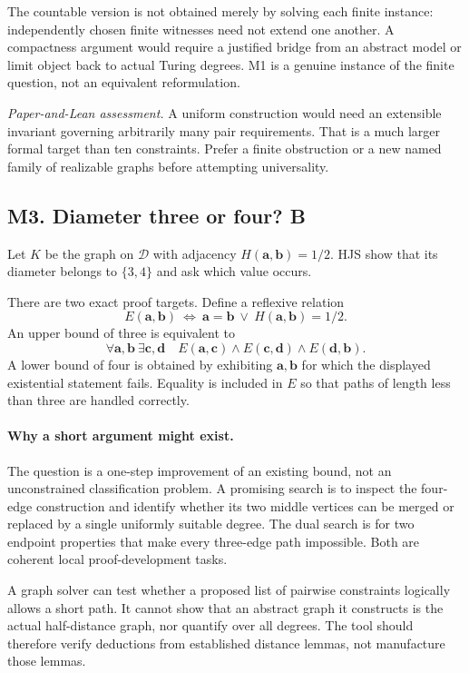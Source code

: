 \documentclass[11pt,a4paper]{article}
\newcommand{\D}{\mathcal D}
\newcommand{\adeg}{\mathbf a}\newcommand{\bdeg}{\mathbf b}
\newcommand{\cdeg}{\mathbf c}\newcommand{\ddeg}{\mathbf d}
\newcommand{\Wmark}{\textbf{B}}\newcommand{\Pmark}{\textbf{R}}\newcommand{\Lmark}{\textbf{H}}
\newcommand{\assessment}[1]{\par\noindent\textit{Paper-and-Lean assessment.} #1\par}
\theoremstyle{definition}\newtheorem{definition}[theorem]{Definition}
\theoremstyle{remark}\newtheorem{remark}[theorem]{Remark}
\begin{document}
The countable version is not obtained merely by solving each finite instance: independently chosen finite witnesses need not extend one another. A compactness argument would require a justified bridge from an abstract model or limit object back to actual Turing degrees. M1 is a genuine instance of the finite question, not an equivalent reformulation.

\assessment{A uniform construction would need an extensible invariant governing arbitrarily many pair requirements. That is a much larger formal target than ten constraints. Prefer a finite obstruction or a new named family of realizable graphs before attempting universality.}

\subsection{M3. Diameter three or four? \Wmark}
\label{entry:M3}
\label{sec:diameter}

Let $K$ be the graph on $\D$ with adjacency $H(\adeg,\bdeg)=1/2$. HJS show that its diameter belongs to $\{3,4\}$ and ask which value occurs.\cite[Question 9.7]{HJS}

There are two exact proof targets. Define a reflexive relation
\[
 E(\adeg,\bdeg)\ \Longleftrightarrow\
     \adeg=\bdeg\ \lor\ H(\adeg,\bdeg)=1/2.
\]
An upper bound of three is equivalent to
\begin{equation}\label{eq:diam3}
 \forall\adeg,\bdeg\ \exists\cdeg,\ddeg\quad
 E(\adeg,\cdeg)\land E(\cdeg,\ddeg)\land E(\ddeg,\bdeg).
\end{equation}
A lower bound of four is obtained by exhibiting $\adeg,\bdeg$ for which the displayed existential statement fails. Equality is included in $E$ so that paths of length less than three are handled correctly.

\paragraph{Why a short argument might exist.}
The question is a one-step improvement of an existing bound, not an unconstrained classification problem. A promising search is to inspect the four-edge construction and identify whether its two middle vertices can be merged or replaced by a single uniformly suitable degree. The dual search is for two endpoint properties that make every three-edge path impossible. Both are coherent local proof-development tasks.

A graph solver can test whether a proposed list of pairwise constraints logically allows a short path. It cannot show that an abstract graph it constructs is the actual half-distance graph, nor quantify over all degrees. The tool should therefore verify deductions from established distance lemmas, not manufacture those lemmas.
\end{document}
